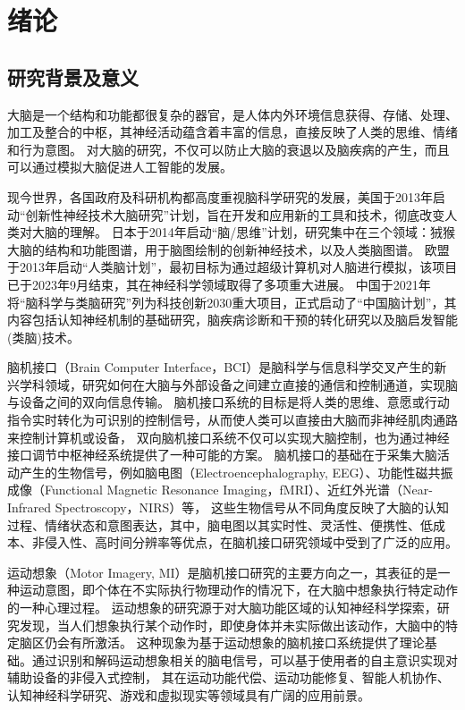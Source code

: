 
\chapter{绪论}

\section{研究背景及意义}

大脑是一个结构和功能都很复杂的器官，是人体内外环境信息获得、存储、处理、加工及整合的中枢\cite{LXTX201902004}，其神经活动蕴含着丰富的信息，直接反映了人类的思维、情绪和行为意图。
对大脑的研究，不仅可以防止大脑的衰退以及脑疾病的产生，而且可以通过模拟大脑促进人工智能的发展\cite{KYYX201907013}。

现今世界，各国政府及科研机构都高度重视脑科学研究的发展，美国于2013年启动“创新性神经技术大脑研究”计划，旨在开发和应用新的工具和技术，彻底改变人类对大脑的理解\cite{jorgenson2015brain}。
日本于2014年启动“脑/思维”计划，研究集中在三个领域：狨猴大脑的结构和功能图谱，用于脑图绘制的创新神经技术，以及人类脑图谱\cite{okano2015brain}。
欧盟于2013年启动“人类脑计划”，最初目标为通过超级计算机对人脑进行模拟，该项目已于2023年9月结束，其在神经科学领域取得了多项重大进展\cite{naddaf2023europe}。
中国于2021年将“脑科学与类脑研究”列为科技创新2030重大项目\cite{china2021brain}，正式启动了“中国脑计划”，其内容包括认知神经机制的基础研究，脑疾病诊断和干预的转化研究以及脑启发智能(类脑)技术\cite{POO2016591}。

脑机接口（Brain Computer Interface，BCI）是脑科学与信息科学交叉产生的新兴学科领域，研究如何在大脑与外部设备之间建立直接的通信和控制通道，实现脑与设备之间的双向信息传输\cite{DKJS202106005}。
脑机接口系统的目标是将人类的思维、意愿或行动指令实时转化为可识别的控制信号，从而使人类可以直接由大脑而非神经肌肉通路来控制计算机或设备，
双向脑机接口系统不仅可以实现大脑控制，也为通过神经接口调节中枢神经系统提供了一种可能的方案\cite{he2020brain}。
脑机接口的基础在于采集大脑活动产生的生物信号，例如脑电图（Electroencephalography, EEG）、功能性磁共振成像（Functional Magnetic Resonance Imaging，fMRI）、近红外光谱（Near-Infrared Spectroscopy，NIRS）等，
这些生物信号从不同角度反映了大脑的认知过程、情绪状态和意图表达，其中，脑电图以其实时性、灵活性、便携性、低成本、非侵入性、高时间分辨率等优点，在脑机接口研究领域中受到了广泛的应用。

运动想象（Motor Imagery, MI）是脑机接口研究的主要方向之一，其表征的是一种运动意图，即个体在不实际执行物理动作的情况下，在大脑中想象执行特定动作的一种心理过程。
运动想象的研究源于对大脑功能区域的认知神经科学探索，研究发现，当人们想象执行某个动作时，即使身体并未实际做出该动作，大脑中的特定脑区仍会有所激活。
这种现象为基于运动想象的脑机接口系统提供了理论基础。通过识别和解码运动想象相关的脑电信号，可以基于使用者的自主意识实现对辅助设备的非侵入式控制，
其在运动功能代偿、运动功能修复\cite{pichiorri2015brain}、智能人机协作、认知神经科学研究、游戏和虚拟现实等领域具有广阔的应用前景。


